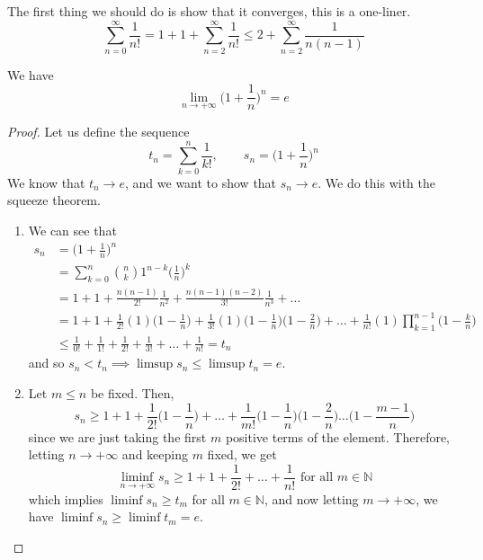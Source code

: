   The first thing we should do is show that it converges, this is a one-liner. 
  \begin{equation}
    \sum_{n=0}^\infty \frac{1}{n!} = 1 + 1 + \sum_{n=2}^\infty \frac{1}{n!} \leq 2 + \sum_{n=2}^\infty \frac{1}{n(n-1)} 
  \end{equation}

  \begin{theorem}
    We have 
    \begin{equation}
      \lim_{n \rightarrow +\infty} \bigg( 1 + \frac{1}{n} \bigg)^n = e 
    \end{equation}
  \end{theorem}
  \begin{proof}
    Let us define the sequence 
    \begin{equation}
      t_n = \sum_{k=0}^n \frac{1}{k!}, \qquad s_n = \bigg( 1 + \frac{1}{n} \bigg)^n
    \end{equation}
    We know that $t_n \rightarrow e$, and we want to show that $s_n \rightarrow e$. We do this with the squeeze theorem. 
    \begin{enumerate}
      \item We can see that 
      \begin{align}
        s_n & = \bigg( 1 + \frac{1}{n} \bigg)^n \\ 
            & = \sum_{k=0}^n \binom{n}{k} 1^{n-k} \bigg( \frac{1}{n} \bigg)^k \\
            & = 1 + 1 + \frac{n(n-1)}{2!} \frac{1}{n^2} + \frac{n(n-1)(n-2)}{3!} \frac{1}{n^3} + \ldots \\ 
            & = 1 + 1 + \frac{1}{2!} (1) \bigg( 1 - \frac{1}{n} \bigg) + \frac{1}{3!} (1) \bigg(1 - \frac{1}{n} \bigg) \bigg(1 - \frac{2}{n} \bigg) + \ldots + \frac{1}{n!} (1) \prod_{k=1}^{n-1} \bigg(1 - \frac{k}{n} \bigg) \\
            & \leq \frac{1}{0!} + \frac{1}{1!} + \frac{1}{2!} + \frac{1}{3!} + \ldots + \frac{1}{n!} = t_n 
      \end{align}
      and so $s_n < t_n \implies \limsup s_n \leq \limsup t_n = e$. 

      \item Let $m \leq n$ be fixed. Then, 
      \begin{equation}
        s_n \geq 1 + 1 + \frac{1}{2!} \bigg( 1 - \frac{1}{n} \bigg) + \ldots + \frac{1}{m!} \bigg(1 - \frac{1}{n} \bigg) \bigg(1 - \frac{2}{n} \bigg) \ldots \bigg(1 - \frac{m-1}{n} \bigg) 
      \end{equation}
      since we are just taking the first $m$ positive terms of the element. Therefore, letting $n \rightarrow +\infty$ and keeping $m$ fixed, we get 
      \begin{equation}
        \liminf_{n \rightarrow +\infty} s_n \geq 1 + 1 + \frac{1}{2!} + \ldots + \frac{1}{n!} \text{ for all } m \in \mathbb{N}
      \end{equation}
      which implies $\liminf s_n \geq t_m$ for all $m \in \mathbb{N}$, and now letting $m \rightarrow +\infty$, we have $\liminf s_n \geq \liminf t_m = e$. 
    \end{enumerate}
  \end{proof}

